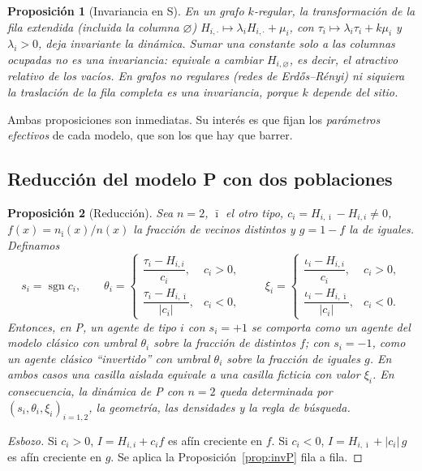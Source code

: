 \documentclass[11pt,a4paper]{article}
\theoremstyle{plain}
\newtheorem{proposicion}{Proposición}
\theoremstyle{definition}
\theoremstyle{remark}
\newcommand{\vac}{\varnothing}
\newcommand{\modP}{\textsf{P}}
\newcommand{\modS}{\textsf{S}}
\begin{document}
\begin{proposicion}[Invariancia en \modS]\label{prop:invS}
En un grafo $k$-regular, la transformación de la fila extendida (incluida la
columna $\vac$) $H_{i,\cdot}\mapsto\lambda_iH_{i,\cdot}+\mu_i$, con
$\tau_i\mapsto\lambda_i\tau_i+k\mu_i$ y $\lambda_i>0$, deja invariante la
dinámica. Sumar una constante solo a las columnas ocupadas \emph{no} es una
invariancia: equivale a cambiar $H_{i,\vac}$, es decir, el atractivo relativo
de los vacíos. En grafos no regulares (redes de Erdős--Rényi) ni siquiera la
traslación de la fila completa es una invariancia, porque $k$ depende del sitio.
\end{proposicion}

Ambas proposiciones son inmediatas. Su interés es que fijan los
\emph{parámetros efectivos} de cada modelo, que son los que hay que barrer.

\subsection{Reducción del modelo \modP{} con dos poblaciones}

\begin{proposicion}[Reducción]\label{prop:reduccion}
Sea $n=2$, $\bar\imath$ el otro tipo, $c_i=H_{i,\bar\imath}-H_{i,i}\neq0$,
$f(x)=n_{\bar\imath}(x)/n(x)$ la fracción de vecinos distintos y $g=1-f$ la de
iguales. Definamos
\[
 s_i=\operatorname{sgn}c_i,\qquad
 \theta_i=\begin{cases}\dfrac{\tau_i-H_{i,i}}{c_i},&c_i>0,\\[2mm]
 \dfrac{\tau_i-H_{i,\bar\imath}}{|c_i|},&c_i<0,\end{cases}\qquad
 \xi_i=\begin{cases}\dfrac{\iota_i-H_{i,i}}{c_i},&c_i>0,\\[2mm]
 \dfrac{\iota_i-H_{i,\bar\imath}}{|c_i|},&c_i<0.\end{cases}
\]
Entonces, en \modP, un agente de tipo $i$ con $s_i=+1$ se comporta como un
agente del modelo clásico con umbral $\theta_i$ sobre la fracción de distintos
$f$; con $s_i=-1$, como un agente clásico ``invertido'' con umbral $\theta_i$
sobre la fracción de iguales $g$. En ambos casos una casilla aislada equivale a
una casilla ficticia con valor $\xi_i$. En consecuencia, la dinámica de \modP{}
con $n=2$ queda determinada por $(s_i,\theta_i,\xi_i)_{i=1,2}$, la geometría,
las densidades y la regla de búsqueda.
\end{proposicion}

\begin{proof}[Esbozo]
Si $c_i>0$, $I=H_{i,i}+c_if$ es afín creciente en $f$. Si $c_i<0$,
$I=H_{i,\bar\imath}+|c_i|\,g$ es afín creciente en $g$. Se aplica la
Proposición~\ref{prop:invP} fila a fila.
\end{proof}
\end{document}
